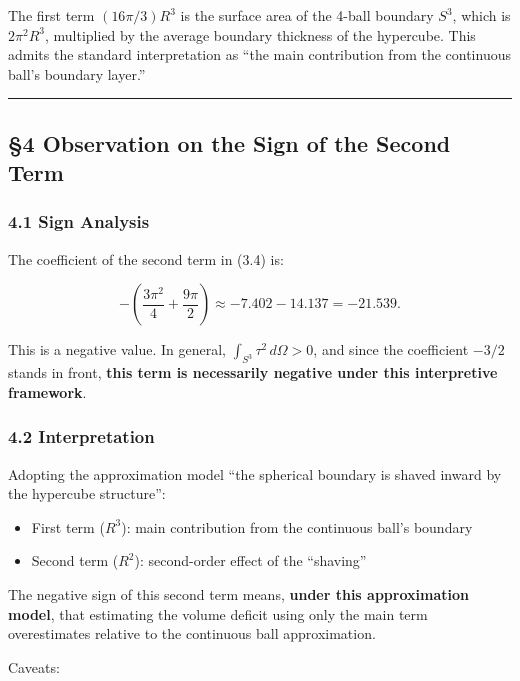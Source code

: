 \documentclass[
]{article}
\providecommand{\tightlist}{%
  \setlength{\itemsep}{0pt}\setlength{\parskip}{0pt}}
\begin{document}
The first term \((16\pi/3)R^3\) is the surface area of the 4-ball
boundary \(S^3\), which is \(2\pi^2 R^3\), multiplied by the average
boundary thickness of the hypercube. This admits the standard
interpretation as ``the main contribution from the continuous ball's
boundary layer.''

\begin{center}\rule{0.5\linewidth}{0.5pt}\end{center}

\subsection{§4 Observation on the Sign of the Second
Term}\label{observation-on-the-sign-of-the-second-term}

\subsubsection{4.1 Sign Analysis}\label{sign-analysis}

The coefficient of the second term in (3.4) is:

\[-\left(\frac{3\pi^2}{4} + \frac{9\pi}{2}\right) \approx -7.402 - 14.137 = -21.539. \tag{4.1}\]

This is a negative value. In general,
\(\int_{S^3}\tau^2 \, d\Omega > 0\), and since the coefficient \(-3/2\)
stands in front, \textbf{this term is necessarily negative under this
interpretive framework}.

\subsubsection{4.2 Interpretation}\label{interpretation}

Adopting the approximation model ``the spherical boundary is shaved
inward by the hypercube structure'':

\begin{itemize}
\tightlist
\item
  First term (\(R^3\)): main contribution from the continuous ball's
  boundary
\item
  Second term (\(R^2\)): second-order effect of the ``shaving''
\end{itemize}

The negative sign of this second term means, \textbf{under this
approximation model}, that estimating the volume deficit using only the
main term overestimates relative to the continuous ball approximation.

Caveats:
\end{document}
